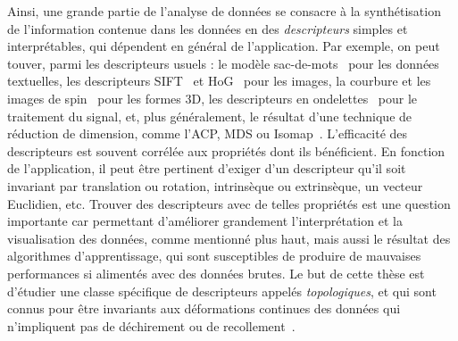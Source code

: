 Ainsi, une grande partie de l'analyse de donn\'ees se consacre \`a la synth\'etisation de l'information contenue dans les donn\'ees
en des {\em descripteurs} simples et interpr\'etables, qui d\'ependent en g\'en\'eral de l'application.
Par exemple, on peut touver, parmi les descripteurs usuels :
le mod\`ele sac-de-mots~\cite{Soumya14} pour les donn\'ees textuelles,
les descripteurs SIFT~\cite{Lowe04} et HoG~\cite{Dalal05} pour les images,
la courbure et les images de spin~\cite{Johnson99} pour les formes 3D,
les descripteurs en ondelettes~\cite{Mallat08} pour le traitement du signal,
et, plus g\'en\'eralement, le r\'esultat d'une technique de r\'eduction de dimension, comme l'ACP, MDS ou Isomap~\cite{Tenenbaum00}.
L'efficacit\'e des descripteurs est souvent corr\'el\'ee aux propri\'et\'es dont ils b\'en\'eficient. En fonction de l'application,
il peut \^etre pertinent d'exiger d'un descripteur qu'il soit invariant par translation ou rotation, intrins\`eque ou extrins\`eque, un vecteur Euclidien, etc.
Trouver des descripteurs avec de telles propri\'et\'es est une question importante car permettant d'am\'eliorer grandement l'interpr\'etation et la visualisation
des donn\'ees, comme mentionn\'e plus haut, mais aussi le r\'esultat des algorithmes d'apprentissage, qui sont susceptibles 
de produire de mauvaises performances si aliment\'es avec des donn\'ees brutes.
Le but de cette th\`ese est d'\'etudier une classe sp\'ecifique de descripteurs appel\'es {\em topologiques}, et qui sont connus
pour \^etre invariants aux d\'eformations continues des donn\'ees qui n'impliquent pas de d\'echirement ou de recollement~\cite{Carlsson09a}. 


